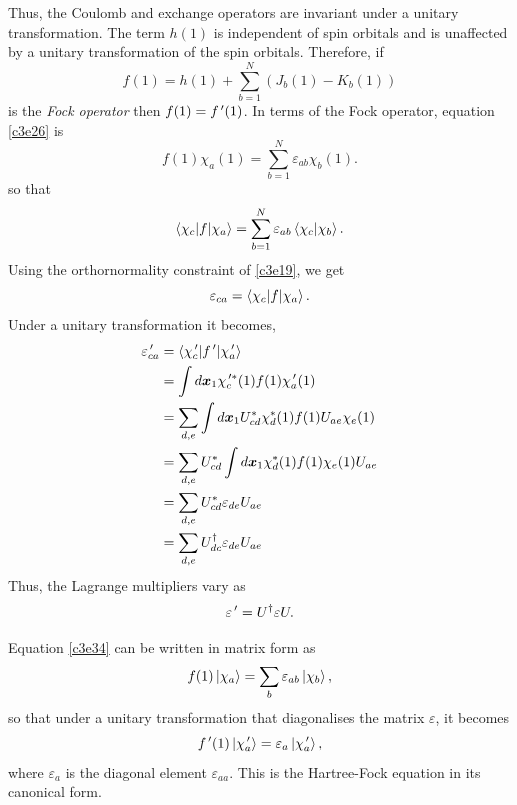 Thus, the Coulomb and exchange operators are invariant under a unitary 
transformation. The term $h(1)$ is independent of spin orbitals and is unaffected
by a unitary transformation of the spin orbitals. Therefore, if
\begin{equation}\label{c3e33}
f(1) = h(1) + \sum_{b=1}^N( J_b(1) - K_b(1))
\end{equation}
is the \emph{Fock operator} then $f(1) = f^{\,\prime}(1)$. In terms of the Fock 
operator, equation \eqref{c3e26} is
\begin{equation}\label{c3e34}
f(1)\chi_a(1) = \sum_{b=1}^N \varepsilon_{ab}\chi_b(1).
\end{equation}
so that
\[
\braket{\chi_c|f|\chi_a} = \sum_{b=1}^N\varepsilon_{ab}\braket{\chi_c|\chi_b}.
\]
Using the orthornormality constraint of \eqref{c3e19}, we get
\begin{equation}\label{c3e35}
\varepsilon_{ca} = \braket{\chi_c|f|\chi_a}.
\end{equation}
Under a unitary transformation it becomes,
\begin{equation}\label{c3e36}
\begin{aligned}
\varepsilon_{ca}^{\,\prime} &= \braket{\chi_c^{\,\prime}|f^{\,\prime}|\chi_a^{\,\prime}} \\
 &= \int d\bm{x}_1 \chi_c^{{\,\prime}\ast}(1) f(1) \chi_a^{\,\prime}(1) \\
 &= \sum_{d,e} \int d\bm{x}_1 U^\ast_{cd}\chi_d^\ast(1)f(1) U_{ae}\chi_e(1) \\
 &= \sum_{d, e} U^\ast_{cd} \int d\bm{x}_1\chi_d^\ast(1)f(1)\chi_e(1)U_{ae} \\
 &= \sum_{d, e} U^\ast_{cd} \varepsilon_{de}U_{ae} \\
 &= \sum_{d, e} U^\dagger_{dc} \varepsilon_{de} U_{ae}
\end{aligned}
\end{equation}
Thus, the Lagrange multipliers vary as
\begin{equation}\label{c3e37}
\varepsilon^{\,\prime} = U^\dagger\varepsilon U.
\end{equation}

Equation \eqref{c3e34} can be written in matrix form as 
\[
f(1)\ket{\chi_a} = \sum_{b}\varepsilon_{ab}\ket{\chi_b},
\]
so that under a unitary transformation that diagonalises the matrix 
$\varepsilon$, it becomes
\begin{equation}\label{c3e38}
f^{\,\prime}(1)\ket{\chi_a^{\,\prime}} = \varepsilon_a\ket{\chi_a^{\,\prime}},
\end{equation}
where $\varepsilon_a$ is the diagonal element $\varepsilon_{aa}$. This is the 
Hartree-Fock equation in its canonical form.


